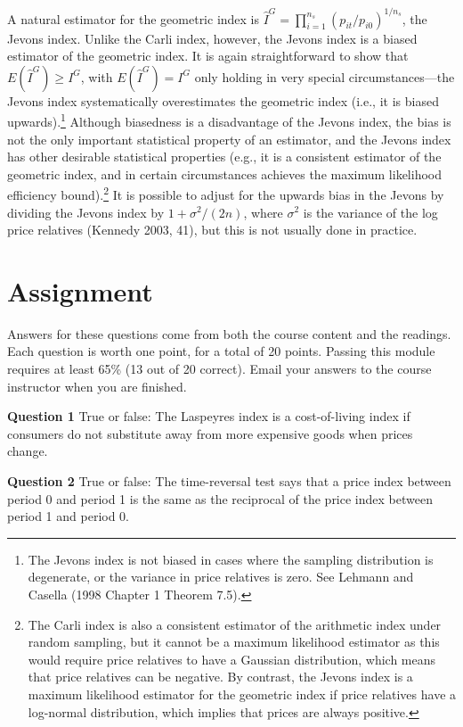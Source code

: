 \documentclass[]{article}
\begin{document}
A natural estimator for the geometric index is \(\hat{I}^{G} = \prod_{i = 1}^{n_{s}} (p_{it} / p_{i0})^{1 / n_{s}}\), the Jevons index. Unlike the Carli index, however, the Jevons index is a biased estimator of the geometric index. It is again straightforward to show that \(E(\hat{I}^{G}) \geq I^{G}\), with \(E(\hat{I}^{G}) = I^{G}\) only holding in very special circumstances---the Jevons index systematically overestimates the geometric index (i.e., it is biased upwards).\footnote{The Jevons index is not biased in cases where the sampling distribution is degenerate, or the variance in price relatives is zero. See Lehmann and Casella (1998 Chapter 1 Theorem 7.5).} Although biasedness is a disadvantage of the Jevons index, the bias is not the only important statistical property of an estimator, and the Jevons index has other desirable statistical properties (e.g., it is a consistent estimator of the geometric index, and in certain circumstances achieves the maximum likelihood efficiency bound).\footnote{The Carli index is also a consistent estimator of the arithmetic index under random sampling, but it cannot be a maximum likelihood estimator as this would require price relatives to have a Gaussian distribution, which means that price relatives can be negative. By contrast, the Jevons index is a maximum likelihood estimator for the geometric index if price relatives have a log-normal distribution, which implies that prices are always positive.} It is possible to adjust for the upwards bias in the Jevons by dividing the Jevons index by \(1 + \sigma^{2}/(2n)\), where \(\sigma^{2}\) is the variance of the log price relatives (Kennedy 2003, 41), but this is not usually done in practice.

\hypertarget{assignment-1}{%
\section{Assignment}\label{assignment-1}}

Answers for these questions come from both the course content and the readings. Each question is worth one point, for a total of 20 points. Passing this module requires at least 65\% (13 out of 20 correct). Email your answers to the course instructor when you are finished.

\textbf{Question 1} True or false: The Laspeyres index is a cost-of-living index if consumers do not substitute away from more expensive goods when prices change.

\textbf{Question 2} True or false: The time-reversal test says that a price index between period 0 and period 1 is the same as the reciprocal of the price index between period 1 and period 0.
\end{document}
